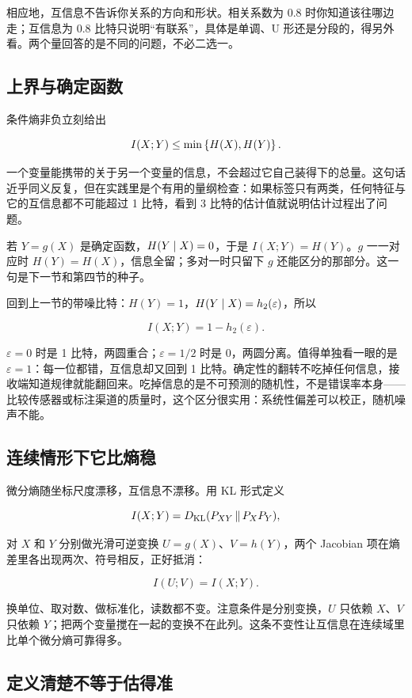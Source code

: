 相应地，互信息不告诉你关系的方向和形状。相关系数为 \(0.8\) 时你知道该往哪边走；互信息为 \(0.8\) 比特只说明``有联系''，具体是单调、U 形还是分段的，得另外看。两个量回答的是不同的问题，不必二选一。

\subsection{上界与确定函数}

条件熵非负立刻给出

\[
I(X;Y)\le\min\left\{H(X),H(Y)\right\}.
\]

一个变量能携带的关于另一个变量的信息，不会超过它自己装得下的总量。这句话近乎同义反复，但在实践里是个有用的量纲检查：如果标签只有两类，任何特征与它的互信息都不可能超过 1 比特，看到 3 比特的估计值就说明估计过程出了问题。

若 \(Y=g(X)\) 是确定函数，\(H(Y\mid X)=0\)，于是 \(I(X;Y)=H(Y)\)。\(g\) 一一对应时 \(H(Y)=H(X)\)，信息全留；多对一时只留下 \(g\) 还能区分的那部分。这一句是下一节和第四节的种子。

回到上一节的带噪比特：\(H(Y)=1\)，\(H(Y\mid X)=h_2(\varepsilon)\)，所以

\[
I(X;Y)=1-h_2(\varepsilon).
\]

\(\varepsilon=0\) 时是 1 比特，两圆重合；\(\varepsilon=1/2\) 时是 0，两圆分离。值得单独看一眼的是 \(\varepsilon=1\)：每一位都错，互信息却又回到 1 比特。确定性的翻转不吃掉任何信息，接收端知道规律就能翻回来。吃掉信息的是不可预测的随机性，不是错误率本身——比较传感器或标注渠道的质量时，这个区分很实用：系统性偏差可以校正，随机噪声不能。

\subsection{连续情形下它比熵稳}

微分熵随坐标尺度漂移，互信息不漂移。用 KL 形式定义

\[
I(X;Y)=D_{\mathrm{KL}}(P_{XY}\,\|\,P_XP_Y),
\]

对 \(X\) 和 \(Y\) 分别做光滑可逆变换 \(U=g(X)\)、\(V=h(Y)\)，两个 Jacobian 项在熵差里各出现两次、符号相反，正好抵消：

\[
I(U;V)=I(X;Y).
\]

换单位、取对数、做标准化，读数都不变。注意条件是分别变换，\(U\) 只依赖 \(X\)、\(V\) 只依赖 \(Y\)；把两个变量搅在一起的变换不在此列。这条不变性让互信息在连续域里比单个微分熵可靠得多。

\subsection{定义清楚不等于估得准}

